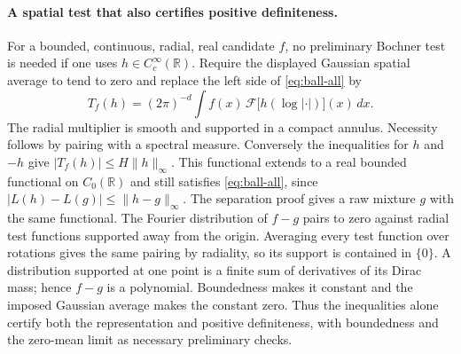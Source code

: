 \documentclass[11pt,a4paper]{article}
\numberwithin{equation}{section}
\begin{document}
\paragraph{A spatial test that also certifies positive definiteness.}
For a bounded, continuous, radial, real candidate $f$, no preliminary
Bochner test is needed if one uses $h\in C_c^\infty(\mathbb R)$.
Require the displayed Gaussian spatial average to tend to zero and
replace the left side of \eqref{eq:ball-all} by
\[
 T_f(h)=(2\pi)^{-d}\int f(x)\,
    \mathcal F\big[h(\log|\cdot|)\big](x)\,dx.
\]
The radial multiplier is smooth and supported in a compact annulus.
Necessity follows by pairing with a spectral measure.
Conversely the inequalities for $h$ and $-h$ give
$|T_f(h)|\le H\|h\|_\infty$. This functional extends to a real
bounded functional on $C_0(\mathbb R)$ and still satisfies
\eqref{eq:ball-all}, since $|L(h)-L(g)|\le\|h-g\|_\infty$.
The separation proof gives a raw mixture $g$ with the same functional.
The Fourier distribution of $f-g$ pairs to zero against radial
test functions supported away from the origin. Averaging every test
function over rotations gives the same pairing by radiality, so its
support is contained in $\{0\}$. A distribution supported at one point
is a finite sum of derivatives of its Dirac mass; hence $f-g$ is a
polynomial. Boundedness makes it constant and the imposed Gaussian
average makes the constant zero. Thus the inequalities alone certify
both the representation and positive definiteness, with boundedness
and the zero-mean limit as necessary preliminary checks.
\end{document}

